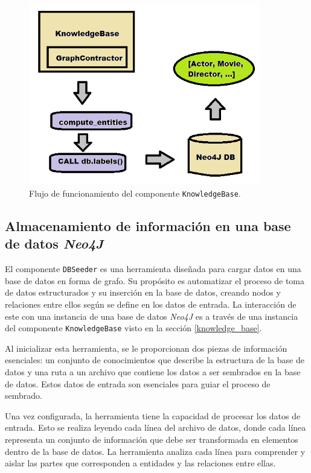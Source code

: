 \begin{figure}[H]\label{dbseeder}
	\centering
	\includegraphics[width = 0.9\textwidth]{./Graphics/knowledgebase}
	\caption{Flujo de funcionamiento del componente \texttt{KnowledgeBase}.}
\end{figure}

\subsection{Almacenamiento de información en una base de datos \textit{Neo4J}} \label{dbseeding}

El componente \texttt{DBSeeder} es una herramienta diseñada para cargar datos en una base de datos en forma de grafo. Su propósito es automatizar el proceso de toma de datos estructurados y su inserción en la base de datos, creando nodos y relaciones entre ellos según se define en los datos de entrada. La interacción de este con una instancia de una base de datos \textit{Neo4J} es a través de una instancia del componente \texttt{KnowledgeBase} visto en la sección \ref{knowledge_base}.

Al inicializar esta herramienta, se le proporcionan dos piezas de información esenciales: un conjunto de conocimientos que describe la estructura de la base de datos y una ruta a un archivo que contiene los datos a ser sembrados en la base de datos. Estos datos de entrada son esenciales para guiar el proceso de sembrado.

Una vez configurada, la herramienta tiene la capacidad de procesar los datos de entrada. Esto se realiza leyendo cada línea del archivo de datos, donde cada línea representa un conjunto de información que debe ser transformada en elementos dentro de la base de datos. La herramienta analiza cada línea para comprender y aislar las partes que corresponden a entidades y las relaciones entre ellas.


